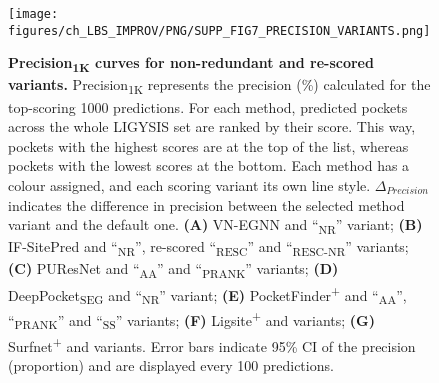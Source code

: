\begin{figure}[ht!]
    \centering
    \texttt{[image: figures/ch\_LBS\_IMPROV/PNG/SUPP\_FIG7\_PRECISION\_VARIANTS.png]}
    \caption[Precision\textsubscript{1K} curves for non-redundant and re-scored variants]{\textbf{Precision\textsubscript{1K} curves for non-redundant and re-scored variants.}  Precision\textsubscript{1K} represents the precision (\%) calculated for the top-scoring 1000 predictions. For each method, predicted pockets across the whole LIGYSIS set are ranked by their score. This way, pockets with the highest scores are at the top of the list, whereas pockets with the lowest scores at the bottom. Each method has a colour assigned, and each scoring variant its own line style. $\Delta_{Precision}$ indicates the difference in precision between the selected method variant and the default one.  \textbf{(A)} VN-EGNN and ``\textsubscript{NR}'' variant; \textbf{(B)} IF-SitePred and ``\textsubscript{NR}'', re-scored ``\textsubscript{RESC}'' and ``\textsubscript{RESC-NR}'' variants; \textbf{(C)} PUResNet and ``\textsubscript{AA}'' and ``\textsubscript{PRANK}'' variants; \textbf{(D)} DeepPocket\textsubscript{SEG} and ``\textsubscript{NR}'' variant; \textbf{(E)} PocketFinder\textsuperscript{+} and ``\textsubscript{AA}'', ``\textsubscript{PRANK}'' and ``\textsubscript{SS}'' variants; \textbf{(F)} Ligsite\textsuperscript{+} and variants; \textbf{(G)} Surfnet\textsuperscript{+} and variants. Error bars indicate 95\% CI of the precision (proportion) and are displayed every 100 predictions.}
    \label{fig:pocket_precision_variants}
\end{figure}

\FloatBarrier

